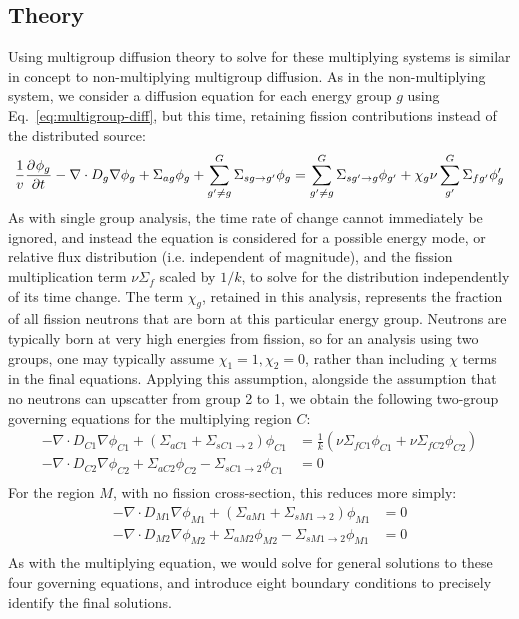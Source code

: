 \documentclass[11pt]{article} %
\begin{document}
\subsection{Theory}
Using multigroup diffusion theory to solve for these multiplying systems is similar in concept to non-multiplying multigroup diffusion.
As in the non-multiplying system, we consider a diffusion equation for each energy group $g$ using Eq.~\ref{eq:multigroup-diff}, but this time, retaining fission contributions instead of the distributed source:
\begin{equation}
    \frac{1}{v}\frac{\partial^{}\phi_g}{\partial{t}^{}} - \nabla\cdot D_g\nabla\phi_g + \Sigma_{ag}\phi_g + \sum_{g'\neq g}^{G}\Sigma_{sg\rightarrow g'}\phi_g=\sum_{g'\neq g}^{G}\Sigma_{sg'\rightarrow g}\phi_{g'} + \chi_g\nu\sum_{g'}^{G}{\Sigma_{fg'}\phi_g'}
    \label{eq:fission-multigroup-diff}
\end{equation}
As with single group analysis, the time rate of change cannot immediately be ignored, and instead the equation is considered for a possible energy mode\cite{strong_npre_2026}, or relative flux distribution (i.e. independent of magnitude), and the fission multiplication term $\nu\Sigma_f$ scaled by $1/k$, to solve for the distribution independently of its time change.
The term $\chi_g$, retained in this analysis, represents the fraction of all fission neutrons that are born at this particular energy group.
Neutrons are typically born at very high energies from fission, so for an analysis using two groups, one may typically assume $\chi_1=1,\chi_2=0$, rather than including $\chi$ terms in the final equations.
Applying this assumption, alongside the assumption that no neutrons can upscatter from group 2 to 1, we obtain the following two-group governing equations for the multiplying region $C$:
\begin{equation}
    \begin{aligned}
        - \nabla\cdot D_{C1}\nabla\phi_{C1} + (\Sigma_{aC1}+\Sigma_{sC1\rightarrow 2})\phi_{C1}&= \frac{1}{k}\left(\nu\Sigma_{fC1}\phi_{C1} + \nu\Sigma_{fC2}\phi_{C2}\right)\\
        - \nabla\cdot D_{C2}\nabla\phi_{C2} + \Sigma_{aC2}\phi_{C2} -  \Sigma_{sC1\rightarrow2}\phi_{C1} &= 0\\
    \end{aligned}
    \label{eq:fission-twogroup}
\end{equation}
For the region $M$, with no fission cross-section, this reduces more simply:
\begin{equation}
    \begin{aligned}
        - \nabla\cdot D_{M1}\nabla\phi_{M1} + (\Sigma_{aM1}+\Sigma_{sM1\rightarrow 2})\phi_{M1}&= 0\\
        - \nabla\cdot D_{M2}\nabla\phi_{M2} + \Sigma_{aM2}\phi_{M2} -  \Sigma_{sM1\rightarrow2}\phi_{M1} &= 0\\
    \end{aligned}
    \label{eq:nothing-twogroup}
\end{equation}
As with the multiplying equation, we would solve for general solutions to these four governing equations, and introduce eight boundary conditions to precisely identify the final solutions.\\
\end{document}
